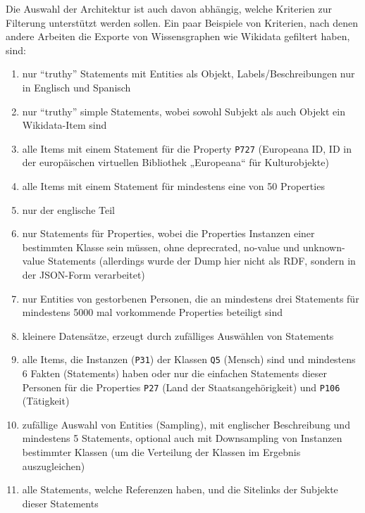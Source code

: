Die Auswahl der Architektur ist auch davon abhängig, welche Kriterien zur Filterung unterstützt werden sollen.
Ein paar Beispiele von Kriterien, nach denen andere Arbeiten die Exporte von Wissensgraphen wie Wikidata gefiltert haben, sind:
\begin{enumerate}[label=\arabic*)]
  \item nur "`truthy"' Statements mit Entities als Objekt, Labels/Beschreibungen nur in Englisch und Spanisch\cite{usage-grafa}
  \item nur "`truthy"' simple Statements, wobei sowohl Subjekt als auch Objekt ein Wikidata-Item sind\cite{usage-wembedder}
  \item alle Items mit einem Statement für die Property \verb|P727| (Europeana ID, ID in der europäischen virtuellen Bibliothek „Europeana“ für Kulturobjekte)\cite{usage-europeana}
  \item alle Items mit einem Statement für mindestens eine von 50 Properties\cite{usage-narratives} 
  \item nur der englische Teil\cite{usage-web-tables} 
  \item nur Statements für Properties, wobei die Properties Instanzen einer bestimmten Klasse sein müssen, ohne deprecrated, no-value und unknown-value Statements\cite{usage-implicational-knowledge} (allerdings wurde der Dump hier nicht als RDF, sondern in der JSON-Form verarbeitet)
  \item nur Entities von gestorbenen Personen, die an mindestens drei Statements für mindestens 5000 mal vorkommende Properties beteiligt sind\cite{usage-learning-structured-embeddings}
  \item kleinere Datensätze, erzeugt durch zufälliges Auswählen von Statements\cite{usage-sparql-benchmark}
  \item alle Items, die Instanzen (\verb|P31|) der Klassen \verb|Q5| (Mensch) sind und mindestens 6 Fakten (Statements) haben\cite{usage-one-sentence} oder nur die einfachen Statements dieser Personen für die Properties \verb|P27| (Land der Staatsangehörigkeit) und \verb|P106| (Tätigkeit)\cite{usage-person-networks}
  \item zufällige Auswahl von Entities (Sampling), mit englischer Beschreibung und mindestens 5 Statements\cite{usage-generate-entity-type-desc}, optional auch mit Downsampling von Instanzen bestimmter Klassen (um die Verteilung der Klassen im Ergebnis auszugleichen)\cite{usage-synthesize-entity-desc}
  \item alle Statements, welche Referenzen haben, und die Sitelinks der Subjekte dieser Statements\cite{wd-wk-common-references}
\end{enumerate}
